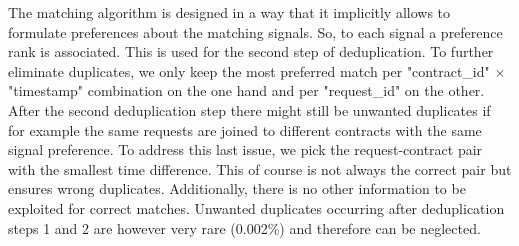 \documentclass[12pt,titlepage]{article}
\begin{document}
The matching algorithm is designed in a way that it implicitly allows to formulate preferences about the matching signals. So, to each signal a preference rank is associated. This is used for the second step of deduplication. To further eliminate duplicates, we only keep the most preferred match per "contract\_id" $\times$ "timestamp" combination on the one hand and per "request\_id" on the other. \\
After the second deduplication step there might still be unwanted duplicates if for example the same requests are joined to different contracts with the same signal preference. To address this last issue, we pick the request-contract pair with the smallest time difference. This of course is not always the correct pair but ensures wrong duplicates. Additionally, there is no other information to be exploited for correct matches. Unwanted duplicates occurring after deduplication steps 1 and 2 are however very rare (0.002\%) and therefore can be neglected. \\
\end{document}
